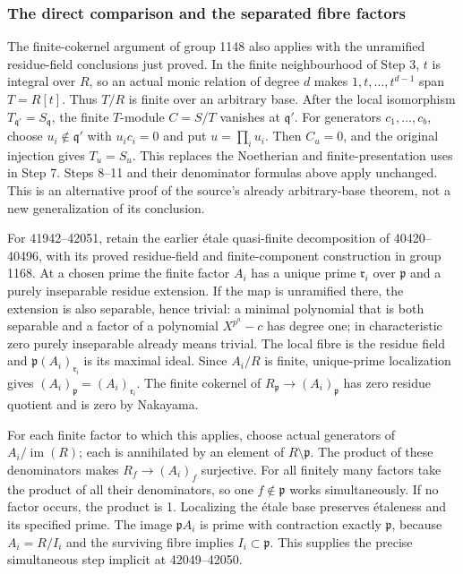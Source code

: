 \subsubsection{The direct comparison and the separated fibre factors}\label{the-direct-comparison-and-the-separated-fibre-factors}

The finite-cokernel argument of group 1148 also applies with the unramified residue-field conclusions just proved. In the finite neighbourhood of Step 3, \(t\) is integral over \(R\), so an actual monic relation of degree \(d\) makes \(1,t,\ldots,t^{d-1}\) span \(T=R[t]\). Thus \(T/R\) is finite over an arbitrary base. After the local isomorphism \(T_{\mathfrak q'}=S_{\mathfrak q}\), the finite \(T\)-module \(C=S/T\) vanishes at \(\mathfrak q'\). For generators \(c_1,\ldots,c_b\), choose \(u_i\notin\mathfrak q'\) with \(u_i c_i=0\) and put \(u=\prod_i u_i\). Then \(C_u=0\), and the original injection gives \(T_u=S_u\). This replaces the Noetherian and finite-presentation uses in Step 7. Steps 8--11 and their denominator formulas above apply unchanged. This is an alternative proof of the source's already arbitrary-base theorem, not a new generalization of its conclusion.

For 41942--42051, retain the earlier étale quasi-finite decomposition of 40420--40496, with its proved residue-field and finite-component construction in group 1168. At a chosen prime the finite factor \(A_i\) has a unique prime \(\mathfrak r_i\) over \(\mathfrak p\) and a purely inseparable residue extension. If the map is unramified there, the extension is also separable, hence trivial: a minimal polynomial that is both separable and a factor of a polynomial \(X^{p^a}-c\) has degree one; in characteristic zero purely inseparable already means trivial. The local fibre is the residue field and \(\mathfrak p(A_i)_{\mathfrak r_i}\) is its maximal ideal. Since \(A_i/R\) is finite, unique-prime localization gives \((A_i)_{\mathfrak p}=(A_i)_{\mathfrak r_i}\). The finite cokernel of \(R_{\mathfrak p}\to(A_i)_{\mathfrak p}\) has zero residue quotient and is zero by Nakayama.

For each finite factor to which this applies, choose actual generators of \(A_i/\operatorname{im}(R)\); each is annihilated by an element of \(R\setminus\mathfrak p\). The product of these denominators makes \(R_f\to(A_i)_f\) surjective. For all finitely many factors take the product of all their denominators, so one \(f\notin\mathfrak p\) works simultaneously. If no factor occurs, the product is 1. Localizing the étale base preserves étaleness and its specified prime. The image \(\mathfrak pA_i\) is prime with contraction exactly \(\mathfrak p\), because \(A_i=R/I_i\) and the surviving fibre implies \(I_i\subset\mathfrak p\). This supplies the precise simultaneous step implicit at 42049--42050.

